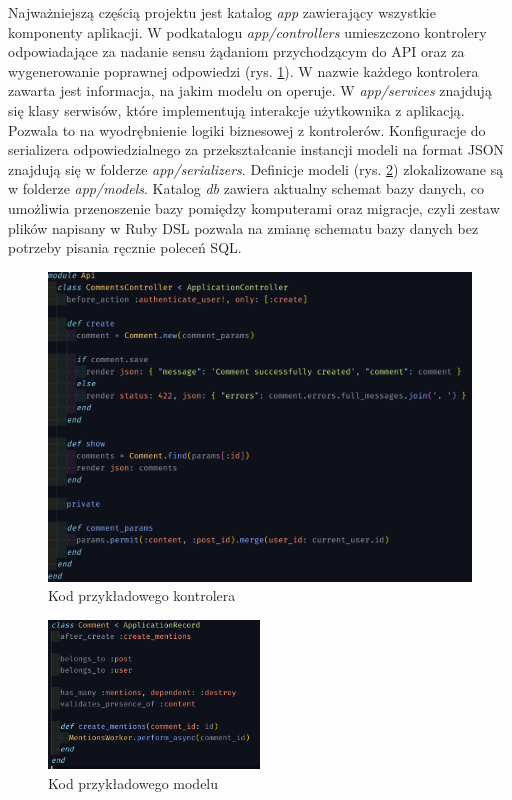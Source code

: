 \documentclass[declaration,shortabstract,polish,inz]{iithesis}
\begin{document}
Najważniejszą częścią projektu jest katalog \textit{app} zawierający wszystkie komponenty aplikacji. W podkatalogu \textit{app/controllers} umieszczono kontrolery odpowiadające za nadanie sensu żądaniom przychodzącym do API oraz za wygenerowanie poprawnej odpowiedzi (rys. \ref{fig:kontroler}). W nazwie każdego kontrolera zawarta jest informacja, na jakim modelu on operuje. W \textit{app/services} znajdują się klasy serwisów, które implementują interakcje użytkownika z aplikacją. Pozwala to na wyodrębnienie logiki biznesowej z kontrolerów. Konfiguracje do serializera odpowiedzialnego za przekształcanie instancji modeli na format JSON znajdują się w folderze \textit{app/serializers}. Definicje modeli (rys. \ref{fig:model}) zlokalizowane są w folderze \textit{app/models}. Katalog \textit{db} zawiera aktualny schemat bazy danych, co umożliwia przenoszenie bazy pomiędzy komputerami oraz migracje, czyli zestaw plików napisany w Ruby DSL pozwala na zmianę schematu bazy danych bez potrzeby pisania ręcznie poleceń SQL.
\begin{figure}
    \centering
    \includegraphics[width=\textwidth]{images/kontroler.png}
    \caption{Kod przykładowego kontrolera}
    \label{fig:kontroler}
\end{figure}
\begin{figure}
    \centering
    \includegraphics[width=0.5\textwidth]{images/comment_model.png}
    \caption{Kod przykładowego modelu}
    \label{fig:model}
\end{figure}
\end{document}
